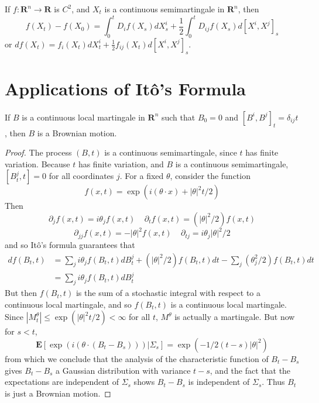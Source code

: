 \begin{theorem}[It\^{o}'s Formula]
    If $f: \mathbf{R}^n \to \mathbf{R}$ is $C^2$, and $X_t$ is a continuous semimartingale in $\mathbf{R}^n$, then
    \[ f(X_t) - f(X_0) = \int_0^t D_i f(X_s) dX^i_s + \frac{1}{2} \int_0^t D_{ij} f(X_s) d[X^i,X^j]_s \]
    or $df(X_t) = f_i(X_t) dX^i_t + \frac{1}{2} f_{ij}(X_t) d[X^i,X^j]_s$.
\end{theorem}

\section{Applications of It\^{o}'s Formula}

\begin{theorem}
    If $B$ is a continuous local martingale in $\mathbf{R}^n$ such that $B_0 = 0$ and $[B^i,B^j]_t = \delta_{ij} t$, then $B$ is a Brownian motion.
\end{theorem}
\begin{proof}
    The process $(B,t)$ is a continuous semimartingale, since $t$ has finite variation. Because $t$ has finite variation, and $B$ is a continuous semimartingale, $[B_t^j,t] = 0$ for all coordinates $j$. For a fixed $\theta$, consider the function
    \[ f(x,t) = \exp(i (\theta \cdot x) + |\theta|^2 t/2) \]
    Then
    \[ \partial_j f(x,t) = i \theta_j f(x,t)\ \ \ \ \ \partial_t f(x,t) = (|\theta|^2/2) f(x,t) \]
    \[ \partial_{jj} f(x,t) = - |\theta|^2 f(x,t)\ \ \ \ \ \partial_{tj} = i \theta_j |\theta|^2/2 \]
    and so It\^{o}'s formula guarantees that
    \begin{align*}
        df(B_t,t) &= \sum_j i \theta_j f(B_t,t) dB_t^j + (|\theta|^2/2) f(B_t,t) dt - \sum_j (\theta_j^2/2) f(B_t,t) dt\\
        &= \sum_j i \theta_j f(B_t,t) dB_t^j
    \end{align*}
    But then $f(B_t,t)$ is the sum of a stochastic integral with respect to a continuous local martingale, and so $f(B_t,t)$ is a continuous local martingale. Since $|M_t^\theta| \leq \exp(|\theta|^2 t/2) < \infty$ for all $t$, $M^\theta$ is actually a martingale. But now for $s < t$,
    \[ \mathbf{E} \left[ \exp(i (\theta \cdot (B_t - B_s))) | \Sigma_s \right] = \exp(-1/2 (t - s) |\theta|^2) \]
    from which we conclude that the analysis of the characteristic function of $B_t - B_s$ gives $B_t - B_s$ a Gaussian distribution with variance $t - s$, and the fact that the expectations are independent of $\Sigma_s$ shows $B_t - B_s$ is independent of $\Sigma_s$. Thus $B_t$ is just a Brownian motion.
\end{proof}

